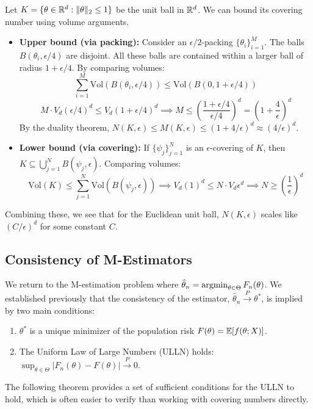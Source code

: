 \begin{eg}
    Let $K = \{\theta \in \mathbb{R}^d : \|\theta\|_2 \le 1\}$ be the unit ball in $\mathbb{R}^d$. We can bound its covering number using volume arguments.
\begin{itemize}
    \item \textbf{Upper bound (via packing):} Consider an $\epsilon/2$-packing $\{\theta_i\}_{i=1}^M$. The balls $B(\theta_i, \epsilon/4)$ are disjoint. All these balls are contained within a larger ball of radius $1 + \epsilon/4$. By comparing volumes:
    $$ \sum_{i=1}^M \text{Vol}(B(\theta_i, \epsilon/4)) \le \text{Vol}(B(0, 1+\epsilon/4)) $$
    $$ M \cdot V_d (\epsilon/4)^d \le V_d (1+\epsilon/4)^d \implies M \le \left(\frac{1+\epsilon/4}{\epsilon/4}\right)^d = \left(1 + \frac{4}{\epsilon}\right)^d $$
    By the duality theorem, $N(K, \epsilon) \le M(K, \epsilon) \le (1+4/\epsilon)^d \approx (4/\epsilon)^d$.

    \item \textbf{Lower bound (via covering):} If $\{ \psi_j \}_{j=1}^N$ is an $\epsilon$-covering of $K$, then $K \subseteq \bigcup_{j=1}^N B(\psi_j, \epsilon)$. Comparing volumes:
    $$ \text{Vol}(K) \le \sum_{j=1}^N \text{Vol}(B(\psi_j, \epsilon)) \implies V_d (1)^d \le N \cdot V_d \epsilon^d \implies N \ge \left(\frac{1}{\epsilon}\right)^d $$
\end{itemize}
Combining these, we see that for the Euclidean unit ball, $N(K, \epsilon)$ scales like $(C/\epsilon)^d$ for some constant $C$.
\end{eg}


\subsection{Consistency of M-Estimators}
We return to the M-estimation problem where $\hat{\theta}_n = \argmin_{\theta \in \Theta} F_n(\theta)$. We established previously that the consistency of the estimator, $\hat{\theta}_n \xrightarrow{P} \theta^*$, is implied by two main conditions:
\begin{enumerate}
    \item $\theta^*$ is a unique minimizer of the population risk $F(\theta) = \mathbb{E}[f(\theta; X)]$.
    \item The Uniform Law of Large Numbers (ULLN) holds: $\sup_{\theta \in \Theta} |F_n(\theta) - F(\theta)| \xrightarrow{P} 0$.
\end{enumerate}

The following theorem provides a set of sufficient conditions for the ULLN to hold, which is often easier to verify than working with covering numbers directly.

